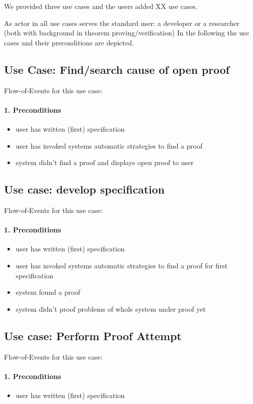 \documentclass{article}
\begin{document}
We provided three use cases and the users added XX use cases.

As actor in all use cases serves the standard user: a developer or a researcher 
(both with background in theorem proving/verification)
In the following the use cases and their preconditions are depicted. 

\subsection{Use Case: Find/search cause of open proof}

Flow-of-Events for this use case:
\paragraph{1. Preconditions}
\begin{itemize}
 \item user has written (first) specification
 \item user has invoked systems automatic strategies to find a proof
 \item system didn't find a proof and displays open proof to user
\end{itemize}


\subsection{Use case: develop specification}
Flow-of-Events for this use case:
\paragraph{1. Preconditions}
\begin{itemize}
 \item user has written (first) specification
 \item user has invoked systems automatic strategies to find a proof for first 
specification
 \item system found a proof 
 \item system didn't proof problems of whole system under proof yet
\end{itemize}

\subsection{Use case: Perform Proof Attempt}
Flow-of-Events for this use case:
\paragraph{1. Preconditions}
\begin{itemize}
 \item user has written (first) specification
\end{itemize}
\end{document}

